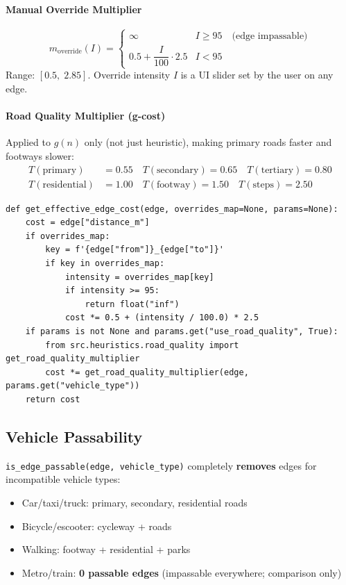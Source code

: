 \documentclass[11pt,a4paper]{article}
\begin{document}
\paragraph{Manual Override Multiplier}
\[
m_{\text{override}}(I) =
\begin{cases}
\infty & I \ge 95 \quad \text{(edge impassable)} \\
0.5 + \dfrac{I}{100}\cdot 2.5 & I < 95
\end{cases}
\]
Range: $[0.5,\; 2.85]$. Override intensity $I$ is a UI slider set by the user on any edge.

\paragraph{Road Quality Multiplier (g-cost)}
Applied to $g(n)$ only (not just heuristic), making primary roads faster and footways slower:
\begin{align*}
T(\text{primary}) &= 0.55 \quad T(\text{secondary}) = 0.65 \quad T(\text{tertiary}) = 0.80 \\
T(\text{residential}) &= 1.00 \quad T(\text{footway}) = 1.50 \quad T(\text{steps}) = 2.50
\end{align*}

\begin{lstlisting}[caption={src/graph/loader.py — get\_effective\_edge\_cost()}]
def get_effective_edge_cost(edge, overrides_map=None, params=None):
    cost = edge["distance_m"]
    if overrides_map:
        key = f'{edge["from"]}_{edge["to"]}'
        if key in overrides_map:
            intensity = overrides_map[key]
            if intensity >= 95:
                return float("inf")
            cost *= 0.5 + (intensity / 100.0) * 2.5
    if params is not None and params.get("use_road_quality", True):
        from src.heuristics.road_quality import get_road_quality_multiplier
        cost *= get_road_quality_multiplier(edge, params.get("vehicle_type"))
    return cost
\end{lstlisting}

\subsection{Vehicle Passability}
\texttt{is\_edge\_passable(edge, vehicle\_type)} completely \textbf{removes} edges for incompatible vehicle types:
\begin{itemize}[noitemsep]
  \item Car/taxi/truck: primary, secondary, residential roads
  \item Bicycle/escooter: cycleway + roads
  \item Walking: footway + residential + parks
  \item Metro/train: \textbf{0 passable edges} (impassable everywhere; comparison only)
\end{itemize}
\end{document}
